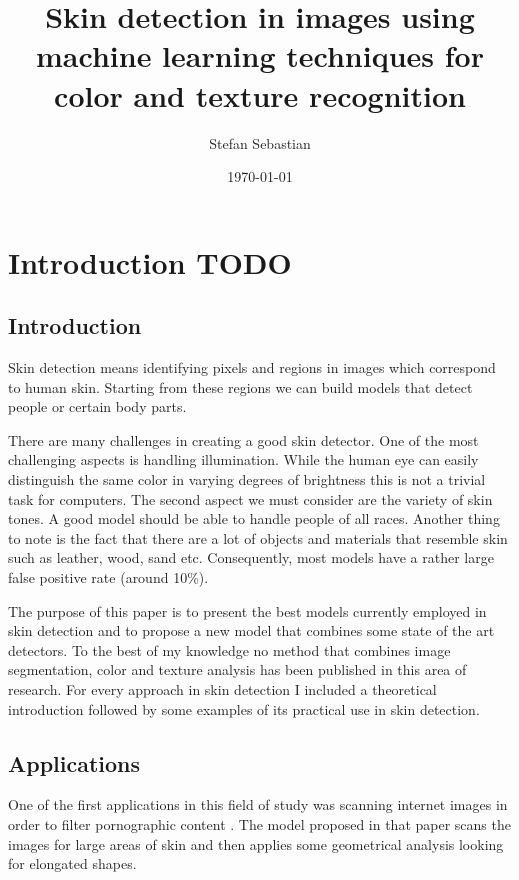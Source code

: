 \documentclass[12pt]{report}
\begin{document}
	\listoftodos
	
	\title{Skin detection in images using machine learning techniques for color and texture recognition}
	\author{Stefan Sebastian}
	\date{\today}
	\maketitle
	
	\newpage
	\tableofcontents
	\newpage
	
	\chapter{Introduction TODO}
	
	\section{Introduction}
	Skin detection means identifying pixels and regions in images which correspond to human skin. Starting from these regions we can build models that detect people or certain body parts.
	
	There are many challenges in creating a good skin detector. One of the most challenging aspects is handling illumination. While the human eye can easily distinguish the same color in varying degrees of brightness this is not a trivial task for computers. The second aspect we must consider are the variety of skin tones. A good model should be able to handle people of all races. Another thing to note is the fact that there are a lot of objects and materials that resemble skin such as leather, wood, sand etc. Consequently, most models have a rather large false positive rate (around 10\%).
	
	The purpose of this paper is to present the best models currently employed in skin detection and to propose a new model that combines some state of the art detectors. To the best of my knowledge no method that combines image segmentation, color and texture analysis has been published in this area of research. For every approach in skin detection I included a theoretical introduction followed by some examples of its practical use in skin detection.
	
	\section{Applications}
	One of the first applications in this field of study was scanning internet images in order to filter pornographic content \cite{finding_naked_people}. The model proposed in that paper scans the images for large areas of skin and then applies some geometrical analysis looking for elongated shapes.
	
\end{document}
